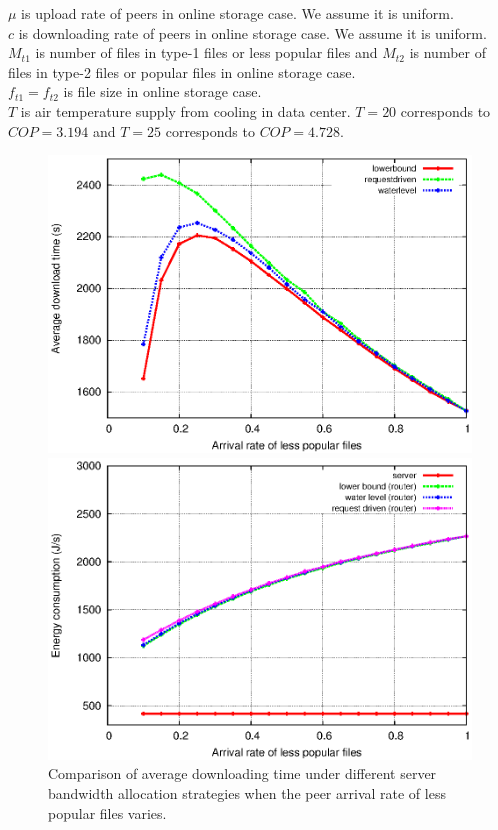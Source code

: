 \documentclass[conference]{IEEEtran}
\begin{document}
$\mu$ is upload rate of peers in online storage case. We assume it is uniform. \\
$c$ is downloading rate of peers in online storage case. We assume it is uniform.
$M_{t1}$ is number of files in type-1 files or less popular files and $M_{t2}$ is number of files in type-2 files or popular files in online storage case.\\
$f_{t1} = f_{t2}$ is file size in online storage case.\\
$T$ is air temperature supply from cooling in data center.  $T=20$ corresponds to $COP=3.194$ and $T=25$ corresponds to $COP=4.728$.\\



\begin{figure}[htp!]
\centering
\begin{minipage}[b]{0.3\linewidth}
	\includegraphics[scale=0.4]{graphs/pop.eps}
	\caption{Comparison of average downloading time under different server bandwidth allocation strategies when the peer arrival rate of less popular files varies.}
	\label{fig:popsimulation}
\end{minipage}
\hfill
\centering
\begin{minipage}[b]{0.3\linewidth}
	\includegraphics[scale=0.4]{graphs/componentconsumption.eps}

\end{minipage}
\end{figure}
\end{document}
